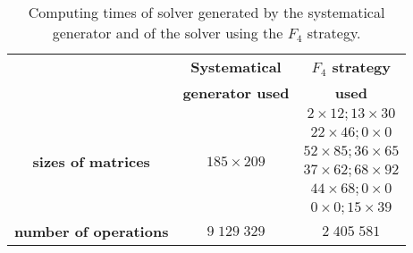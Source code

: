 ~\vfill
\begin{table}[ht]
  \centering
  \begin{tabular}{|c||cc|}
    \hline
    & \textbf{Systematical}    & \textbf{$F_4$ strategy} \\
    &  \textbf{generator used} & \textbf{used} \\
    \hline\hline
    
    \multirow{6}{*}{\textbf{sizes of matrices}} & \multirow{6}{*}{$185 \times 209$} & $2 \times 12; 13 \times 30$\\
     & & $22\times46; 0\times 0$\\
     & & $52\times85; 36\times 65$\\
     & & $37\times62; 68\times 92$\\
     & & $44\times68; 0\times 0$\\
     & & $0\times0; 15\times 39$\\
     \textbf{number of operations} & $9\;129\;329$ & $2\;405\;581$\\
    \hline
  \end{tabular}
  \caption{Computing times of solver generated by the systematical generator and of the solver using the $F_4$ strategy.}
  \label{tab:gen}
\end{table}
\vfill
